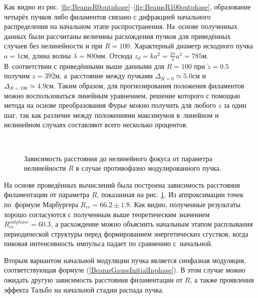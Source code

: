 Как видно из рис. \ref{fig:BeamsR0outphase}--\ref{fig:BeamsR100outphase}, образование четырёх пучков либо филаментов
связано с дифракцией начального распределения на начальном этапе распространения. На~основе полученных данных были рассчитаны
величины расхождения пучков для приведённых случаев без нелинейности и при $R = 100$. Характерный диаметр исходного
пучка $a = 1\text{см}$, длина волны $\lambda = 800\text{нм}$. Отсюда $z_d = k a^2 = \frac{2\pi}{\lambda} a^2 = 785\text{м}$.
В~соответствии с приведёнными выше данными для $R = 100$ при $\tilde{z} = 0.5$ получим $z = 392\text{м}$, а~расстояние между пучками
$\Delta_{R = 0} \simeq 5.0\text{см}$ и $\Delta_{R = 100} \simeq 4.9\text{см}$. Таким образом, для прогнозирования
положения филаментов можно воспользоваться линейным уравнением, решение которого с помощью метода на основе преобразования Фурье можно
получить для любого $z$ за один шаг, так как различие между положениями максимумов в~линейном и нелинейном случаях
составляют всего несколько процентов.

\begin{figure}[h!]
    \begin{center}
        \begin{minipage}{\minipagewidthtwo}
        \end{minipage}
       \\[1ex]
        \caption{Зависимость расстояния до нелинейного фокуса от параметра нелинейности $R$ в случае противофазно модулированного пучка.}
        \label{fig:BeamsZfillOutphase}
    \end{center}
\end{figure}

На основе проведённых вычислений была построена зависимость расстояния филаментации от параметра $R$,
показанная на рис. \ref{fig:BeamsZfillOutphase}. Из аппроксимации точек по~формуле Марбургера $R_{cr} = 66.2 \pm 1.8$.
Как видно, полученные результаты хорошо согласуются с полученным выше теоретическим значением $R_{cr}^{outphase} = 60.3$,
а расхождение можно объяснить начальным этапом расплывания периодической структуры перед формированием энергетических
сгустков, когда пиковая интенсивность импульса падает по сравнению с~начальной.


Вторым вариантом начальной модуляции пучка является синфазная модуляция, соответствующая формуле (\ref{BeamsGaussInitialInphase}).
В этом случае можно ожидать другую зависимость расстояния филаментации от $R$, а также проявления
эффекта Тальбо на начальной стадии распада пучка.

